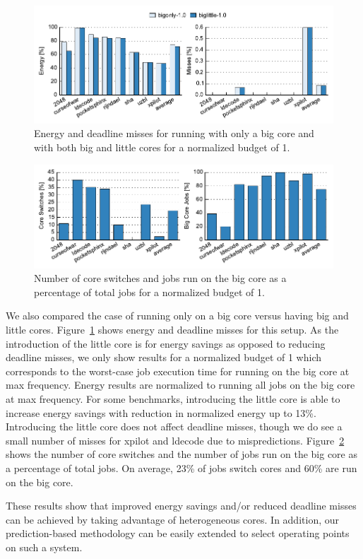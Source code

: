 \begin{figure}
  \begin{center}
    \includegraphics{exec_time_prediction/data/hetero_big_em.pdf}
    \caption{Energy and deadline misses for running with only a big core and
    with both big and little cores for a normalized budget of 1.}
    \label{fig:exec_time_prediction.evaluation.hetero_big_em}
  \end{center}
\end{figure}

\begin{figure}
  \begin{center}
    \includegraphics{exec_time_prediction/data/hetero_big_counts.pdf}
    \caption{Number of core switches and jobs run on the big core as a
    percentage of total jobs for a normalized budget of 1.}
    \label{fig:exec_time_prediction.evaluation.hetero_big_counts}
  \end{center}
\end{figure}

We also compared the case of running only on a big core versus having big and
little cores. Figure~\ref{fig:exec_time_prediction.evaluation.hetero_big_em} shows
energy and deadline misses for this setup. As the introduction of the little
core is for energy savings as opposed to reducing deadline misses, we only show
results for a normalized budget of 1 which corresponds to the worst-case job
execution time for running on the big core at max frequency. Energy results
are normalized to running all jobs on the big core at max frequency. For some
benchmarks, introducing the little core is able to increase energy savings with
reduction in normalized energy up to 13\%. Introducing the little core does not
affect deadline misses, though we do see a small number of misses for xpilot
and ldecode due to mispredictions.
Figure~\ref{fig:exec_time_prediction.evaluation.hetero_big_counts} shows the
number of core switches and the number of jobs run on the big core as a
percentage of total jobs. On average, 23\% of jobs switch cores and 60\% are
run on the big core.

These results show that improved energy savings and/or reduced deadline misses
can be achieved by taking advantage of heterogeneous cores. In addition, our
prediction-based methodology can be easily extended to select operating points
on such a system.
